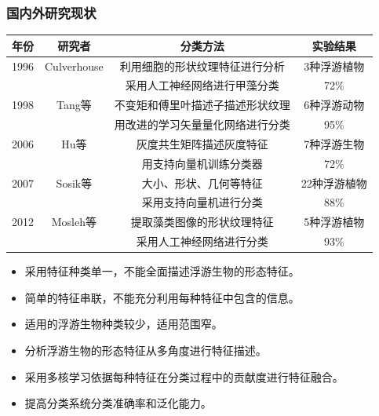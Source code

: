 \documentclass[notheorems,mathserif,table,compress]{beamer}  %
\begin{document}
\begin{frame}
\frametitle{国内外研究现状}
\begin{table}
  \small
  \begin{tabular}[c]{|c|c|c|c|}
  \hline
  年份 & 研究者 & 分类方法 & 实验结果\\
  \hline
  1996 & Culverhouse &  利用细胞的形状纹理特征进行分析 & 3种浮游植物 \\
   & & 采用人工神经网络进行甲藻分类 & 72\%\\
  \hline
  1998 & Tang等 & 不变矩和傅里叶描述子描述形状纹理 & 6种浮游动物 \\ 
  & & 用改进的学习矢量量化网络进行分类 & 95\%\\
  \hline
  2006 & Hu等 & 灰度共生矩阵描述灰度特征 & 7种浮游生物\\
  & & 用支持向量机训练分类器 & 72\%\\
  \hline
  2007 & Sosik等 & 大小、形状、几何等特征 & 22种浮游植物 \\
  & & 采用支持向量机进行分类 & 88\%\\
  \hline
  2012 & Mosleh等 &  提取藻类图像的形状纹理特征 & 5种浮游植物 \\
  & & 采用人工神经网络进行分类 & 93\%\\
  \hline
  \end{tabular}
\end{table}
\end{frame}

\begin{frame}
\begin{tcolorbox}[colback=red!5,colframe=blue!75!black]
  \begin{itemize}
  \item 采用特征种类单一，不能全面描述浮游生物的形态特征。
  \item 简单的特征串联，不能充分利用每种特征中包含的信息。
  \item 适用的浮游生物种类较少，适用范围窄。
  \end{itemize}
\end{tcolorbox}
\pause
\begin{tcolorbox}[colback=red!5,colframe=blue!75!black]
  \begin{itemize}
  \item 分析浮游生物的形态特征从多角度进行特征描述。%
  \item 采用多核学习依据每种特征在分类过程中的贡献度进行特征融合。
  \item 提高分类系统分类准确率和泛化能力。%
  \end{itemize}
  \end{tcolorbox}
\end{frame}
\end{document}
